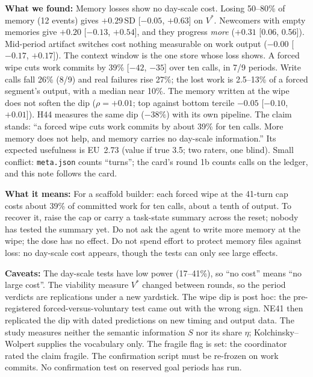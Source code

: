 \textbf{What we found:}
Memory losses show no day-scale cost.
Losing 50--80\% of memory (12 events) gives $+0.29$\,SD [$-0.05$, $+0.63$] on $V^*$.
Newcomers with empty memories give $+0.20$ [$-0.13$, $+0.54$], and they progress \emph{more} ($+0.31$ [0.06, 0.56]).
Mid-period artifact switches cost nothing measurable on work output ($-0.00$ [$-0.17$, $+0.17$]).
The context window is the one store whose loss shows.
A forced wipe cuts work commits by 39\% [$-42$, $-35$] over ten calls, in 7/9 periods.
Write calls fall 26\% (8/9) and real failures rise 27\%; the lost work is 2.5--13\% of a forced segment's output, with a median near 10\%.
The memory written at the wipe does not soften the dip ($\rho=+0.01$; top against bottom tercile $-0.05$ [$-0.10$, $+0.01$]).
H44 measures the same dip ($-38\%$) with its own pipeline.
The claim stands: ``a forced wipe cuts work commits by about 39\% for ten calls. More memory does not help, and memory carries no day-scale information.''
Its expected usefulness is EU~2.73 (value if true 3.5; two raters, one blind).
Small conflict: \texttt{meta.json} counts ``turns''; the card's round 1b counts calls on the ledger, and this note follows the card.

\textbf{What it means:}
For a scaffold builder: each forced wipe at the 41-turn cap costs about 39\% of committed work for ten calls, about a tenth of output.
To recover it, raise the cap or carry a task-state summary across the reset; nobody has tested the summary yet.
Do not ask the agent to write more memory at the wipe; the dose has no effect.
Do not spend effort to protect memory files against loss: no day-scale cost appears, though the tests can only see large effects.

\textbf{Caveats:}
The day-scale tests have low power (17--41\%), so ``no cost'' means ``no large cost''.
The viability measure $V^*$ changed between rounds, so the period verdicts are replications under a new yardstick.
The wipe dip is post hoc: the pre-registered forced-versus-voluntary test came out with the wrong sign.
NE41 then replicated the dip with dated predictions on new timing and output data.
The study measures neither the semantic information $S$ nor its share $\eta$; Kolchinsky--Wolpert supplies the vocabulary only.
The fragile flag is set: the coordinator rated the claim fragile.
The confirmation script must be re-frozen on work commits.
No confirmation test on reserved goal periods has run.
